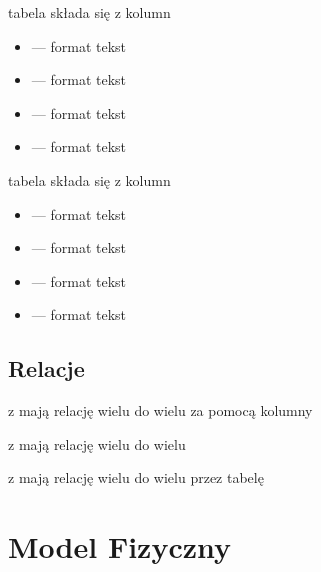 \documentclass[letterpaper,10pt,polish]{sphinxmanual}
\begin{document}
\sphinxAtStartPar
tabela  składa się z kolumn
\begin{itemize}
\item {} 
\sphinxAtStartPar
{} — format tekst

\item {} 
\sphinxAtStartPar
{} — format tekst

\item {} 
\sphinxAtStartPar
{} — format tekst

\item {} 
\sphinxAtStartPar
{} — format tekst

\end{itemize}

\sphinxAtStartPar
tabela  składa się z kolumn
\begin{itemize}
\item {} 
\sphinxAtStartPar
{} — format tekst

\item {} 
\sphinxAtStartPar
{} — format tekst

\item {} 
\sphinxAtStartPar
{} — format tekst

\item {} 
\sphinxAtStartPar
{} — format tekst

\end{itemize}


\subsection{Relacje}
\label{\detokenize{rozdzial3/index:id1}}
\sphinxAtStartPar
{} z  mają relację wielu do wielu za pomocą kolumny 

\sphinxAtStartPar
{} z  mają relację wielu do wielu 

\sphinxAtStartPar
{} z  mają relację wielu do wielu przez tabelę 


\section{Model Fizyczny}
\label{\detokenize{rozdzial3/index:model-fizyczny}}
\end{document}
